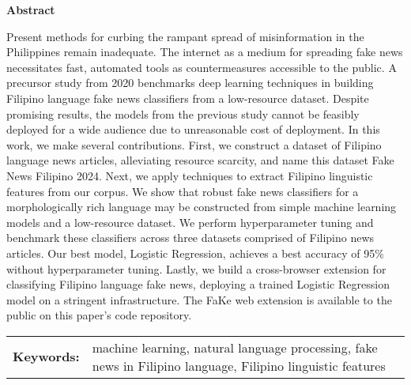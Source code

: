 
\begin{center}
    \textbf{Abstract}
    \end{center}
    \setlength{\parindent}{0pt}
    Present methods for curbing the rampant spread of misinformation in the Philippines remain inadequate. The internet as a medium for spreading fake news necessitates fast, automated tools as countermeasures accessible to the public. A precursor study from 2020 benchmarks deep learning techniques in building Filipino language fake news classifiers from a low-resource dataset. Despite promising results, the models from the previous study cannot be feasibly deployed for a wide audience due to unreasonable cost of deployment. In this work, we make several contributions. First, we construct a dataset of Filipino language news articles, alleviating resource scarcity, and name this dataset Fake News Filipino 2024. Next, we apply techniques to extract Filipino linguistic features from our corpus. We show that robust fake news classifiers for a morphologically rich language may be constructed from simple machine learning models and a low-resource dataset. We perform hyperparameter tuning and benchmark these classifiers across three datasets comprised of Filipino news articles. Our best model, Logistic Regression, achieves a best accuracy of 95\% without hyperparameter tuning. Lastly, we build a cross-browser extension for classifying Filipino language fake news, deploying a trained Logistic Regression model on a stringent infrastructure. The FaKe web extension is available to the public on this paper's code repository.


    \begin{tabular}{lp{4.25in}}
    \hspace{-0.5em}\textbf{Keywords:}\hspace{0.25em} & machine learning, natural language processing, fake news in Filipino language, Filipino linguistic features
    \\
\end{tabular}

